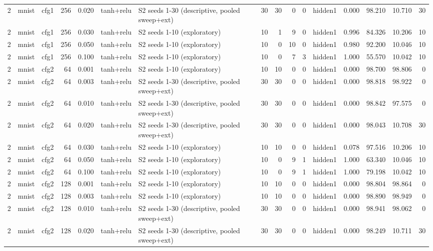 \begin{table}[htbp]
{\begin{tabular}{@{}rllrrllrrrrlrrrr@{}}
2 & mnist & cfg1 & 256 & 0.020 & tanh+relu & S2 seeds 1-30 (descriptive, pooled sweep+ext) & 30 & 30 & 0 & 0 & hidden1 & 0.000 & 98.210 & 10.710 & 30 \\
2 & mnist & cfg1 & 256 & 0.030 & tanh+relu & S2 seeds 1-10 (exploratory) & 10 & 1 & 9 & 0 & hidden1 & 0.996 & 84.326 & 10.206 & 10 \\
2 & mnist & cfg1 & 256 & 0.050 & tanh+relu & S2 seeds 1-10 (exploratory) & 10 & 0 & 10 & 0 & hidden1 & 0.980 & 92.200 & 10.046 & 10 \\
2 & mnist & cfg1 & 256 & 0.100 & tanh+relu & S2 seeds 1-10 (exploratory) & 10 & 0 & 7 & 3 & hidden1 & 1.000 & 55.570 & 10.042 & 10 \\
2 & mnist & cfg2 & 64 & 0.001 & tanh+relu & S2 seeds 1-10 (exploratory) & 10 & 10 & 0 & 0 & hidden1 & 0.000 & 98.700 & 98.806 & 0 \\
2 & mnist & cfg2 & 64 & 0.003 & tanh+relu & S2 seeds 1-30 (descriptive, pooled sweep+ext) & 30 & 30 & 0 & 0 & hidden1 & 0.000 & 98.818 & 98.922 & 0 \\
2 & mnist & cfg2 & 64 & 0.010 & tanh+relu & S2 seeds 1-30 (descriptive, pooled sweep+ext) & 30 & 30 & 0 & 0 & hidden1 & 0.000 & 98.842 & 97.575 & 0 \\
2 & mnist & cfg2 & 64 & 0.020 & tanh+relu & S2 seeds 1-30 (descriptive, pooled sweep+ext) & 30 & 30 & 0 & 0 & hidden1 & 0.000 & 98.043 & 10.708 & 30 \\
2 & mnist & cfg2 & 64 & 0.030 & tanh+relu & S2 seeds 1-10 (exploratory) & 10 & 10 & 0 & 0 & hidden1 & 0.078 & 97.516 & 10.206 & 10 \\
2 & mnist & cfg2 & 64 & 0.050 & tanh+relu & S2 seeds 1-10 (exploratory) & 10 & 0 & 9 & 1 & hidden1 & 1.000 & 63.340 & 10.046 & 10 \\
2 & mnist & cfg2 & 64 & 0.100 & tanh+relu & S2 seeds 1-10 (exploratory) & 10 & 0 & 9 & 1 & hidden1 & 1.000 & 79.198 & 10.042 & 10 \\
2 & mnist & cfg2 & 128 & 0.001 & tanh+relu & S2 seeds 1-10 (exploratory) & 10 & 10 & 0 & 0 & hidden1 & 0.000 & 98.804 & 98.864 & 0 \\
2 & mnist & cfg2 & 128 & 0.003 & tanh+relu & S2 seeds 1-10 (exploratory) & 10 & 10 & 0 & 0 & hidden1 & 0.000 & 98.890 & 98.949 & 0 \\
2 & mnist & cfg2 & 128 & 0.010 & tanh+relu & S2 seeds 1-30 (descriptive, pooled sweep+ext) & 30 & 30 & 0 & 0 & hidden1 & 0.000 & 98.941 & 98.062 & 0 \\
2 & mnist & cfg2 & 128 & 0.020 & tanh+relu & S2 seeds 1-30 (descriptive, pooled sweep+ext) & 30 & 30 & 0 & 0 & hidden1 & 0.000 & 98.249 & 10.711 & 30 \\

\end{tabular}}
\end{table}
